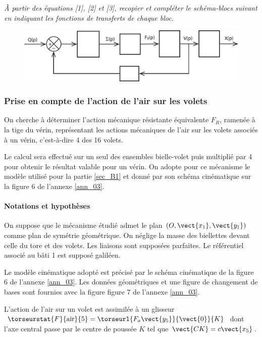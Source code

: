\documentclass[10pt,fleqn]{article} %
\begin{document}
\subparagraph{\label{q_22}}\textit{À partir des équations [1], [2] et [3], recopier et compléter le schéma-blocs suivant en indiquant les fonctions de transferts de chaque bloc.}

\begin{figure}[H]
\centering
\includegraphics[width=.8\linewidth]{dr_Q22}
\end{figure}


\subsubsection{Prise en compte de l'action de l'air sur les volets }

\begin{obj}
On cherche à déterminer l'action mécanique résistante équivalente $F_R$, ramenée à la tige du vérin, représentant les actions mécaniques de l'air sur les volets associés à un vérin, c'est-à-dire 4 des 16 volets.
\end{obj}


Le calcul sera effectué sur un seul des ensembles bielle-volet puis multiplié par 4 pour obtenir le résultat valable pour un vérin. On adopte pour ce mécanisme le modèle utilisé pour la partie \ref{sec_B1} et donné par son schéma cinématique sur la figure 6 de l'annexe \ref{ann_03}.


\paragraph*{Notations et hypothèses}
On suppose que le mécanisme étudié admet le plan $\left(O,\vect{x_1}, \vect{y_1}\right)$ comme plan de symétrie géométrique. On néglige la masse des biellettes devant celle du tore et des volets. Les liaisons sont supposées parfaites. Le référentiel associé au bâti 1 est supposé galiléen.

Le modèle cinématique adopté est précisé par le schéma cinématique de la figure 6 de l'annexe \ref{ann_03}. Les données géométriques et une figure de changement de bases sont fournies avec la figure figure 7 de l'annexe \ref{ann_03}.

L'action de l'air sur un volet est assimilée à un glisseur $\torseurstat{F}{\text{air}}{5} = \torseurl{F_a\vect{y_5}}{\vect{0}}{K}$ dont l'axe central passe par le centre de poussée $K$ tel que  $\vect{CK}=c\vect{x_5}$.
\end{document}
